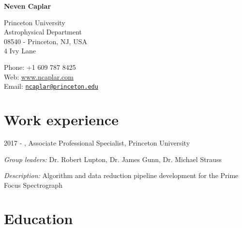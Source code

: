 \documentclass[11pt,letterpaper]{article}
\def\name{\textbf{Neven Caplar}}
\renewenvironment{itemize}{
  \begin{list}{}{
    \setlength{\leftmargin}{1.5em}
    \setlength{\itemsep}{0.10em}
    \setlength{\parskip}{0pt}
    \setlength{\parsep}{0.10em}
  }
}{
  \end{list}
}
\begin{document}
{\huge \name}


\bigskip

\begin{minipage}[t]{0.645\textwidth}
  Princeton University\\
  Astrophysical Department \\
  08540 - Princeton, NJ, USA	 \\
	4 Ivy Lane
\end{minipage}
\begin{minipage}[t]{0.345\textwidth}
  Phone: +1 609 787 8425 \\
  Web: \href{ www.ncaplar.com}{www.ncaplar.com} \\
  Email: \href{ncaplar@princeton.edu}{\nolinkurl{ncaplar@princeton.edu}} \\

\end{minipage}


\section*{Work experience}

\begin{itemize}
  \item 2017 - , Associate Professional Specialist, Princeton University
  \item \textit{Group leaders:} Dr. Robert Lupton, Dr. James Gunn, Dr. Michael Strauss 
  \item \textit{Description:} Algorithm and  data reduction pipeline  development for the Prime Focus Spectrograph
\end{itemize}  


\section*{Education}
\end{document}
